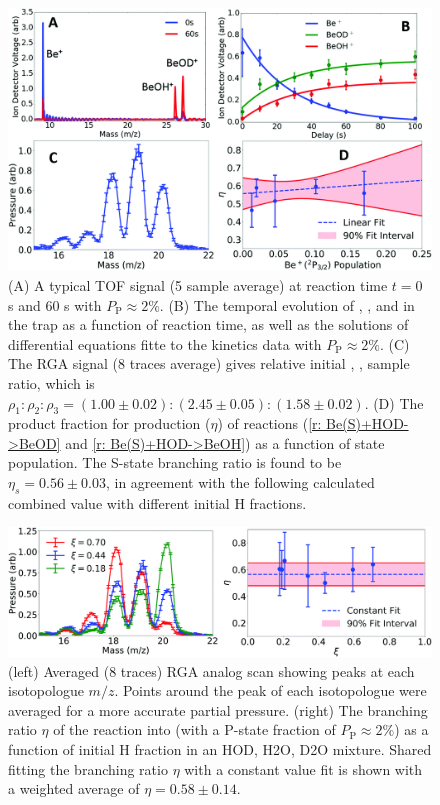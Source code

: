 \begin{figure}
	\centering
	\includegraphics[width=\textwidth]{images/Be_HOD_set.png}
	\caption{(A) A typical TOF signal (5 sample average) at reaction time $t=0$ s and 60 s with $P_{\mathrm{P}} \approx 2\%$. (B) The temporal evolution of , , and  in the trap as a function of reaction time, as well as the solutions of differential equations fitte to the kinetics data with $P_{\mathrm{P}} \approx 2\%$. (C) The RGA signal (8 traces average) gives relative initial , ,  sample ratio, which is $\rho_1:\rho_2:\rho_3=(1.00 \pm 0.02):(2.45 \pm 0.05):(1.58 \pm 0.02)$. (D) The product fraction for  production ($\eta$) of reactions (\ref{r: Be(S)+HOD->BeOD} and \ref{r: Be(S)+HOD->BeOH}) as a function of  state population. The S-state branching ratio is found to be $\eta_s=0.56 \pm 0.03$, in agreement with the following calculated combined value with different initial H fractions.}
	\label{fig: Be+HOD procedure}
\end{figure}

\begin{figure}
	\centering
	\includegraphics[width=\textwidth]{images/Be_HOD_HOD_frac.png}
	\caption{(left) Averaged (8 traces) RGA analog scan showing peaks at each isotopologue $m/z$. Points around the peak of each isotopologue were averaged for a more accurate partial pressure. (right) The branching ratio $\eta$ of the reaction  into  (with a  P-state fraction of $P_{\mathrm{P}} \approx 2\%$) as a function of initial H fraction in an HOD, H2O, D2O mixture. Shared fitting the branching ratio $\eta$ with a constant value fit is shown with a weighted average of $\eta = 0.58 \pm 0.14$.}
	\label{}
\end{figure}

